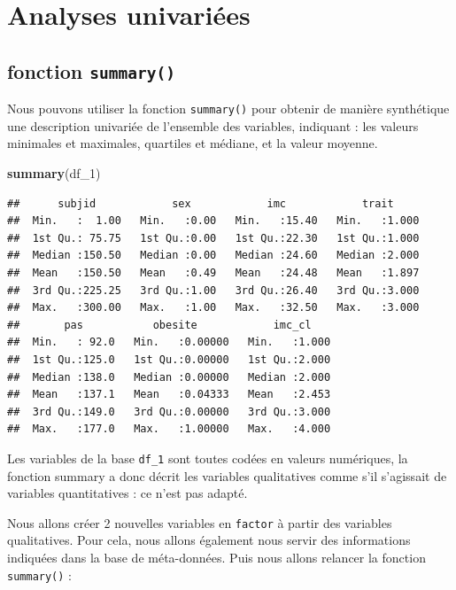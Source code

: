 \documentclass[
]{book}
\newenvironment{Shaded}{\begin{snugshade}}{\end{snugshade}}
\newcommand{\FunctionTok}[1]{\textcolor[rgb]{0.13,0.29,0.53}{\textbf{#1}}}
\newcommand{\NormalTok}[1]{#1}
\begin{document}
\section{Analyses univariées}\label{analyses-univariuxe9es}

\subsection{\texorpdfstring{fonction \texttt{summary()}}{fonction summary()}}\label{fonction-summary}

Nous pouvons utiliser la fonction \texttt{summary()} pour obtenir de manière synthétique une description univariée de l'ensemble des variables, indiquant : les valeurs minimales et maximales, quartiles et médiane, et la valeur moyenne.

\begin{Shaded}
\begin{Highlighting}[]
\FunctionTok{summary}\NormalTok{(df\_1)}
\end{Highlighting}
\end{Shaded}

\begin{verbatim}
##      subjid            sex            imc            trait      
##  Min.   :  1.00   Min.   :0.00   Min.   :15.40   Min.   :1.000  
##  1st Qu.: 75.75   1st Qu.:0.00   1st Qu.:22.30   1st Qu.:1.000  
##  Median :150.50   Median :0.00   Median :24.60   Median :2.000  
##  Mean   :150.50   Mean   :0.49   Mean   :24.48   Mean   :1.897  
##  3rd Qu.:225.25   3rd Qu.:1.00   3rd Qu.:26.40   3rd Qu.:3.000  
##  Max.   :300.00   Max.   :1.00   Max.   :32.50   Max.   :3.000  
##       pas           obesite            imc_cl     
##  Min.   : 92.0   Min.   :0.00000   Min.   :1.000  
##  1st Qu.:125.0   1st Qu.:0.00000   1st Qu.:2.000  
##  Median :138.0   Median :0.00000   Median :2.000  
##  Mean   :137.1   Mean   :0.04333   Mean   :2.453  
##  3rd Qu.:149.0   3rd Qu.:0.00000   3rd Qu.:3.000  
##  Max.   :177.0   Max.   :1.00000   Max.   :4.000
\end{verbatim}

Les variables de la base \texttt{df\_1} sont toutes codées en valeurs numériques, la fonction summary a donc décrit les variables qualitatives comme s'il s'agissait de variables quantitatives : ce n'est pas adapté.

Nous allons créer 2 nouvelles variables en \texttt{factor} à partir des variables qualitatives. Pour cela, nous allons également nous servir des informations indiquées dans la base de méta-données. Puis nous allons relancer la fonction \texttt{summary()} :
\end{document}
